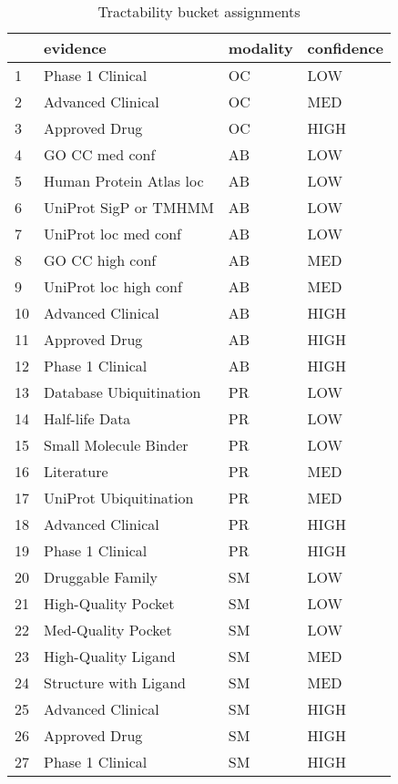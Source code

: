 \begin{table}
\centering
\caption{Tractability bucket assignments}
\label{tab:tractability_buckets}
\begin{tabular}{llll}
\toprule
 & evidence & modality & confidence \\
\midrule
1 & Phase 1 Clinical & OC & LOW \\
2 & Advanced Clinical & OC & MED \\
3 & Approved Drug & OC & HIGH \\
4 & GO CC med conf & AB & LOW \\
5 & Human Protein Atlas loc & AB & LOW \\
6 & UniProt SigP or TMHMM & AB & LOW \\
7 & UniProt loc med conf & AB & LOW \\
8 & GO CC high conf & AB & MED \\
9 & UniProt loc high conf & AB & MED \\
10 & Advanced Clinical & AB & HIGH \\
11 & Approved Drug & AB & HIGH \\
12 & Phase 1 Clinical & AB & HIGH \\
13 & Database Ubiquitination & PR & LOW \\
14 & Half-life Data & PR & LOW \\
15 & Small Molecule Binder & PR & LOW \\
16 & Literature & PR & MED \\
17 & UniProt Ubiquitination & PR & MED \\
18 & Advanced Clinical & PR & HIGH \\
19 & Phase 1 Clinical & PR & HIGH \\
20 & Druggable Family & SM & LOW \\
21 & High-Quality Pocket & SM & LOW \\
22 & Med-Quality Pocket & SM & LOW \\
23 & High-Quality Ligand & SM & MED \\
24 & Structure with Ligand & SM & MED \\
25 & Advanced Clinical & SM & HIGH \\
26 & Approved Drug & SM & HIGH \\
27 & Phase 1 Clinical & SM & HIGH \\
\bottomrule
\end{tabular}
\end{table}

